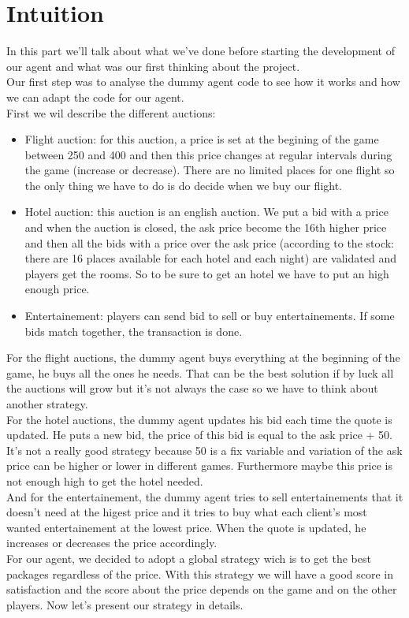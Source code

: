 \section{Intuition}

In this part we'll talk about what we've done before starting the development of our agent and what was our first thinking about the project.\\
Our first step was to analyse the dummy agent code to see how it works and how we can adapt the code for our agent.\\
First we wil describe the different auctions:\\
\begin{itemize}
\item Flight auction: for this auction, a price is set at the begining of the game between 250 and 400 and then this price changes at regular intervals during the game (increase or decrease). There are no limited places for one flight so the only thing we have to do is do decide when we buy our flight.
\item Hotel auction: this auction is an english auction. We put a bid with a price and when the auction is closed, the ask price become the 16th higher price and then all the bids with a price over the ask price (according to the stock: there are 16 places available for each hotel and each night) are validated and players get the rooms. So to be sure to get an hotel we have to put an high enough price.
\item Entertainement: players can send bid to sell or buy entertainements. If some bids match together, the transaction is done.
\end{itemize}
For the flight auctions, the dummy agent buys everything at the beginning of the game, he buys all the ones he needs. That can be the best solution if by luck all the auctions will grow but it's not always the case so we have to think about another strategy.\\
For the  hotel auctions, the dummy agent updates his bid each time the quote is updated. He puts a new bid, the price of this bid is equal to the ask price + 50. It's not a really good strategy because 50 is a fix variable and variation of the ask price can be higher or lower in different games. Furthermore maybe this price is not enough high to get the hotel needed.\\
And for the entertainement, the dummy agent tries to sell entertainements that it doesn't need at the higest price and it tries to buy what each client's most wanted entertainement at the lowest price. When the quote is updated, he increases or decreases the price accordingly.\\
For our agent, we decided to adopt a global strategy wich is to get the best packages regardless of the price. With this strategy we will have a good score in satisfaction and the score about the price depends on the game and on the other players.
Now let's present our strategy in details.
